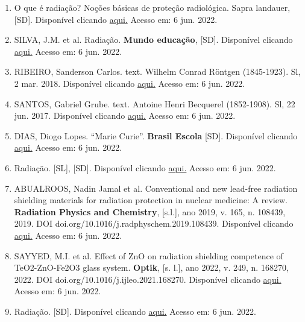 \artigotres
\begin{enumerate}
    \item \label{ref1:artigo3} O que é radiação? Noções básicas de proteção radiológica. Sapra landauer, [SD]. Disponível clicando \href{https://www.sapralandauer.com.br/protecao-radiologica-saiba-sobre-os-principais-aspectos-normas-e-tecnologias-empregadas/o-que-e-radiacao-nocoes-basicas-de-protecao-radiologica/}{aqui.} Acesso em: 6 jun. 2022.
    \item \label{ref2:artigo3} SILVA, J.M. et al. Radiação. \textbf{Mundo educação}, [SD]. Disponível clicando \href{https://mundoeducacao.uol.com.br/quimica/radiacoes.htm}{aqui.} Acesso em: 6 jun. 2022.
    \item \label{ref3:artigo3} RIBEIRO, Sanderson Carlos. text. Wilhelm Conrad Röntgen (1845-1923). Sl, 2 mar. 2018. Disponível clicando \href{https://www3.unicentro.br/petfisica/2018/03/02/wilhelm-conrad-rontgen-1845-1923/}{aqui.} Acesso em: 6 jun. 2022.
    \item \label{ref4:artigo3} SANTOS, Gabriel Grube. text. Antoine Henri Becquerel (1852-1908). Sl, 22 jun. 2017. Disponível clicando \href{https://www3.unicentro.br/petfisica/2017/06/22/antoine-henri-becquerel-1852-1908/}{aqui.} Acesso em: 6 jun. 2022.
    \item \label{ref5:artigo3} DIAS, Diogo Lopes. ``Marie Curie''. \textbf{Brasil Escola} [SD]. Disponível clicando \href{https://www.astropt.org/2014/04/09/movimento-browniano/}{aqui.} Acesso em: 6 jun. 2022.
    \item \label{ref6:artigo3} Radiação. [SL], [SD]. Disponível clicando \href{http://www.fiocruz.br/biosseguranca/Bis/lab_virtual/radiacao.html}{aqui.} Acesso em: 6 jun. 2022.
    \item \label{ref7:artigo3} ABUALROOS, Nadin Jamal et al. Conventional and new lead-free radiation shielding materials for radiation protection in nuclear medicine: A review. \textbf{Radiation Physics and Chemistry}, [s.l.], ano 2019, v. 165, n. 108439, 2019. DOI doi.org/10.1016/j.radphyschem.2019.108439. Disponível clicando \href{https://www.sciencedirect.com/science/article/abs/pii/S0969806X19305699}{aqui.} Acesso em: 6 jun. 2022.
    \item \label{ref8:artigo3} SAYYED, M.I. et al. Effect of ZnO on radiation shielding competence of TeO2-ZnO-Fe2O3 glass system. \textbf{Optik}, [s. l.], ano 2022, v. 249, n. 168270, 2022. DOI doi.org/10.1016/j.ijleo.2021.168270. Disponível clicando \href{https://www.sciencedirect.com/science/article/abs/pii/S0030402621017903?via\%3Dihub}{aqui.} Acesso em: 6 jun. 2022.
    \item \label{ref9:artigo3} Radiação. [SD]. Disponível clicando \href{https://www.fisica.net/aplicada/biofisica/radiacao.php}{aqui.} Acesso em: 6 jun. 2022.
\end{enumerate}

